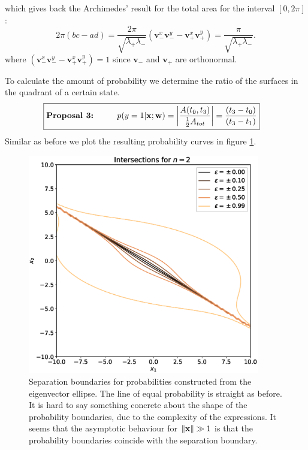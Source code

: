 which gives back the Archimedes' result for the total area for the interval $[0, 2 \pi]$:
\begin{equation*}
    2\pi(bc - ad) = \frac{2\pi}{\sqrt{\lambda_+ \lambda_-}} (\mathbf{v}_-^x \mathbf{v}_-^y - \mathbf{v}_+^x \mathbf{v}_+^y) = \frac{\pi}{\sqrt{\lambda_+ \lambda_-}}.
\end{equation*}
where $(\mathbf{v}_-^x \mathbf{v}_-^y - \mathbf{v}_+^x \mathbf{v}_+^y)=1$ since $\mathbf{v}_-$ and $\mathbf{v}_+$ are orthonormal. \newline

\noindent To calculate the amount of probability we determine the ratio of the surfaces in the quadrant of a certain state. 
\begin{align*}
    \Aboxed{
    \text{\textbf{Proposal 3:}\hspace{1cm}} p(y=1|\mathbf{x};\mathbf{w})=\abs{\frac{A(t_0,t_3)}{\frac{1}{2}A_{tot}}} = \frac{(t_3 - t_0)}{(t_3 - t_1)}}
\end{align*}
Similar as before we plot the resulting probability curves in figure \ref{fig:ellipse_boundary}.
\begin{figure}[htb!]
    \centering
    \includegraphics[width = 0.9\textwidth]{figures/chapter3/intersections_ellipse.eps}
    \caption{Separation boundaries for probabilities constructed from the eigenvector ellipse. The line of equal probability is straight as before. It is hard to say something concrete about the shape of the probability boundaries, due to the complexity of the expressions. It seems that the asymptotic behaviour for $\norm{\mathbf{x}}\gg1$ is that the probability boundaries coincide with the separation boundary.}
    \label{fig:ellipse_boundary}
\end{figure}

